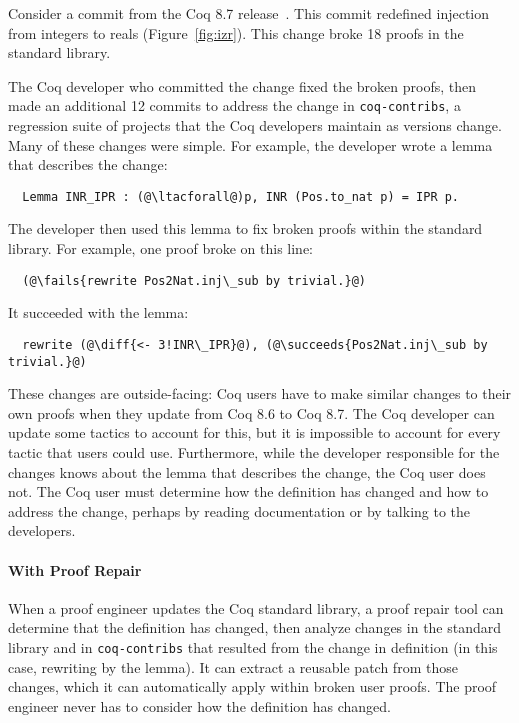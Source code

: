 Consider a commit from the Coq 8.7 release~\cite{coq87commit}. 
This commit redefined injection from integers to reals (Figure~\ref{fig:izr}).
This change broke 18 proofs in the standard library. 

The Coq developer who committed the change fixed the broken proofs, then
made an additional 12 commits to address the change in \lstinline{coq-contribs},
a regression suite of projects that the Coq developers maintain as versions change.
Many of these changes were simple. For example, the developer wrote a lemma that describes the change:

\lstset{language=coq, aboveskip=3pt, belowskip=3pt}
\begin{lstlisting}
  Lemma INR_IPR : (@\ltacforall@)p, INR (Pos.to_nat p) = IPR p.
\end{lstlisting}
The developer then used this lemma to fix broken proofs within the standard library. 
For example, one proof broke on this line:

\begin{lstlisting}
  (@\fails{rewrite Pos2Nat.inj\_sub by trivial.}@)
\end{lstlisting}
It succeeded with the lemma:

\begin{lstlisting}
  rewrite (@\diff{<- 3!INR\_IPR}@), (@\succeeds{Pos2Nat.inj\_sub by trivial.}@)
\end{lstlisting}

These changes are outside-facing: Coq users have to make similar changes to their own proofs when
they update from Coq 8.6 to Coq 8.7. The Coq developer can update some tactics to account for this, but it is 
impossible to account for every tactic that users could use.
Furthermore, while the developer responsible for the changes knows about
the lemma that describes the change, the Coq user does not. The Coq user must determine
how the definition has changed and how to address the change, perhaps by reading documentation or by
talking to the developers. 

\paragraph{With Proof Repair} When a proof engineer updates the Coq standard library, a proof repair tool can determine
that the definition has changed, then analyze changes in the standard library and in \lstinline{coq-contribs}
that resulted from the change in definition (in this case, rewriting by the lemma).
It can extract a reusable patch from those changes, which it can automatically apply within broken user proofs.
The proof engineer never has to consider how the definition has changed.

